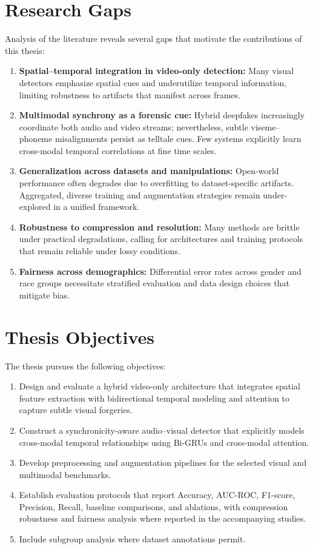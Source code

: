 \section{Research Gaps}
Analysis of the literature reveals several gaps that motivate the contributions of this thesis:
\begin{enumerate}[leftmargin=*,label=(\alph*)]
    \item \textbf{Spatial–temporal integration in video-only detection:} Many visual detectors emphasize spatial cues and underutilize temporal information, limiting robustness to artifacts that manifest across frames.
    \item \textbf{Multimodal synchrony as a forensic cue:} Hybrid deepfakes increasingly coordinate both audio and video streams; nevertheless, subtle viseme–phoneme misalignments persist as telltale cues. Few systems explicitly learn cross-modal temporal correlations at fine time scales.
    \item \textbf{Generalization across datasets and manipulations:} Open-world performance often degrades due to overfitting to dataset-specific artifacts. Aggregated, diverse training and augmentation strategies remain under-explored in a unified framework.
    \item \textbf{Robustness to compression and resolution:} Many methods are brittle under practical degradations, calling for architectures and training protocols that remain reliable under lossy conditions.
    \item \textbf{Fairness across demographics:} Differential error rates across gender and race groups necessitate stratified evaluation and data design choices that mitigate bias.
\end{enumerate}

\section{Thesis Objectives}
The thesis pursues the following objectives:
\begin{enumerate}[leftmargin=*,label=\arabic*.]
    \item Design and evaluate a hybrid video-only architecture that integrates spatial feature extraction with bidirectional temporal modeling and attention to capture subtle visual forgeries.
    \item Construct a synchronicity-aware audio–visual detector that explicitly models cross-modal temporal relationships using Bi-GRUs and cross-modal attention.
    \item Develop preprocessing and augmentation pipelines for the selected visual and multimodal benchmarks.
    \item Establish evaluation protocols that report Accuracy, AUC-ROC, F1-score, Precision, Recall, baseline comparisons, and ablations, with compression robustness and fairness analysis where reported in the accompanying studies.
    \item Include subgroup analysis where dataset annotations permit.
\end{enumerate}


